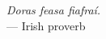 
\thispagestyle{empty}


\vspace*{3cm}

\begin{center}
{\slshape  	Doras feasa fiafra\'{i}.  }\\ \medskip
--- Irish proverb  
\end{center}

\medskip


